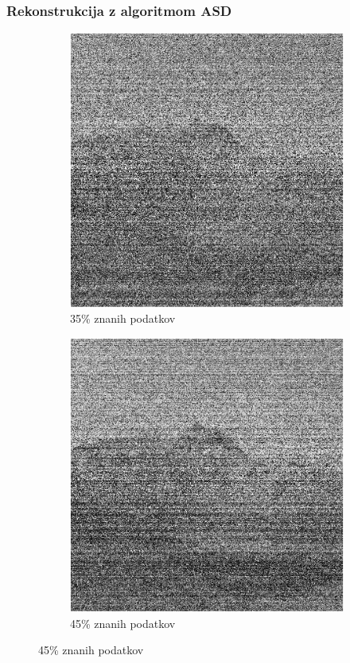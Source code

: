 \documentclass{beamer}
\begin{document}
\begin{frame}
  \frametitle{Rekonstrukcija z algoritmom ASD}
  \begin{figure}
    \begin{subfigure}{0.49\linewidth}
      \includegraphics[width=\linewidth]{slike/gora/slikaRez35ASD400.png}
      \caption{35\% znanih podatkov}
    \end{subfigure}
    \begin{subfigure}{0.49\linewidth}
      \includegraphics[width=\linewidth]{slike/gora/slikaRez45ASD600.png}
      \caption{45\% znanih podatkov}
    \end{subfigure}
  \end{figure}
\end{frame}
\end{document}
